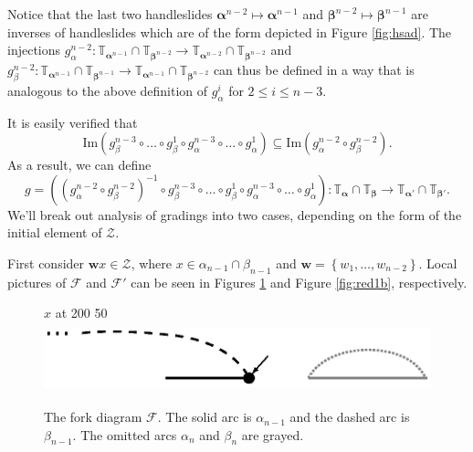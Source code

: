\documentclass[11pt]{article}
\theoremstyle{plain} \newtheorem{thm}{Theorem}[subsection]
\theoremstyle{plain} \newtheorem{cor}[thm]{Corollary}
\theoremstyle{plain} \newtheorem{prop}[thm]{Proposition}
\theoremstyle{plain} \newtheorem{conj}[thm]{Conjecture}
\theoremstyle{plain} \newtheorem{lem}[thm]{Lemma}
\theoremstyle{definition} \newtheorem{df}[thm]{Definition}
\theoremstyle{remark} \newtheorem{rmk}[thm]{Remark}
\theoremstyle{remark} \newtheorem{obs}[thm]{Observation}
\newcommand{\Zcal}{\mathcal{Z}}
\newcommand{\Fcal}{\mathcal{F}}
\newcommand{\ba}{\boldsymbol{\alpha}}
\newcommand{\bb}{\boldsymbol{\beta}}
\newcommand{\bw}{\mathbf{w}}
\newcommand{\tor}[1]{\mathbb{T}_{#1}}
\numberwithin{equation}{section}
\begin{document}
Notice that the last two handleslides $\ba^{n-2} \mapsto \ba^{n-1}$ and $\bb^{n-2} \mapsto \bb^{n-1}$ are inverses of handleslides which are of the form depicted in Figure \ref{fig:hsad}.  The injections $g_{\alpha}^{n-2}: \tor{\ba^{n-1}} \cap \tor{\bb^{n-2}} \rightarrow \tor{\ba^{n-2}} \cap \tor{\bb^{n-2}}$ and $g_{\beta}^{n-2}: \tor{\ba^{n-1}} \cap \tor{\bb^{n-1}} \rightarrow \tor{\ba^{n-1}} \cap \tor{\bb^{n-2}}$ can thus be defined in a way that is analogous to the above definition of $g_{\alpha}^i$ for $2 \leq i \leq n-3$.

It is easily verified that
$$ \text{Im} \left( g_{\beta}^{n-3} \circ \ldots \circ g_{\beta}^{1} \circ g_{\alpha}^{n-3} \circ \ldots \circ g_{\alpha}^{1} \right) \subseteq \text{Im}\left( g_{\alpha}^{n-2} \circ g_{\beta}^{n-2} \right).$$
As a result, we can define
$$ g = \left(  \left( g_{\alpha}^{n-2} \circ g_{\beta}^{n-2} \right)^{-1} \circ g_{\beta}^{n-3} \circ \ldots \circ g_{\beta}^{1} \circ g_{\alpha}^{n-3} \circ \ldots \circ g_{\alpha}^{1} \right): \tor{\ba} \cap \tor{\bb} \rightarrow \tor{\ba'} \cap \tor{\bb'}.$$
We'll break out analysis of gradings into two cases, depending on the form of the initial element of $\Zcal$.

First consider $\bw x \in \Zcal$, where $x \in \alpha_{n-1} \cap \beta_{n-1}$ and $\bw = \left\{ w_1, \ldots, w_{n-2} \right\}$.  Local pictures of $\mathcal{F}$ and $\mathcal{F}'$ can be seen in Figures \ref{fig:red1a} and Figure \ref{fig:red1b}, respectively.

\begin{figure}[h!]
\centering
\begin{minipage}[c]{.55\linewidth}
\small
\pinlabel* $x$ at 200 50
\endlabellist
\includegraphics[height = 20mm]{Red1a}
\end{minipage}
\begin{minipage}[c]{.35\linewidth}
\caption[The fork diagram $\Fcal$ in case I of Lemma \ref{lem:RredR}]{The fork diagram $\mathcal{F}$.  The solid arc is $\alpha_{n-1}$ and the dashed arc is $\beta_{n-1}$.  The omitted arcs $\alpha_{n}$ and $\beta_{n}$ are grayed. \label{fig:red1a}}
\end{minipage}
\end{figure}
\end{document}
